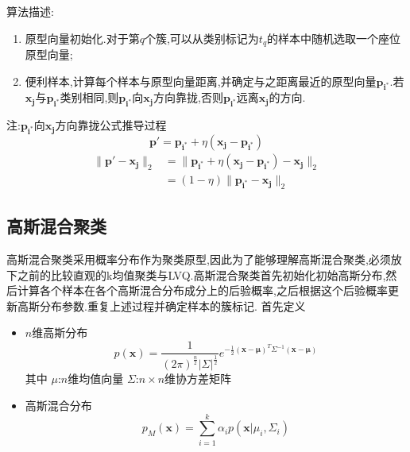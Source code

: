 算法描述:
\begin{enumerate}
\item 原型向量初始化.对于第$q$个簇,可以从类别标记为$t_q$的样本中随机选取一个座位原型向量;
\item 便利样本,计算每个样本与原型向量距离,并确定与之距离最近的原型向量$\mathbf{p_{i^\ast}}$.若$\mathbf{x_j}$与$\mathbf{p_{i^\ast}}$类别相同,则$\mathbf{p_{i^\ast}}$向$\mathbf{x_j}$方向靠拢,否则$\mathbf{p_{i^\ast}}$远离$\mathbf{x_j}$的方向.
\end{enumerate}
注:$\mathbf{p_{i^\ast}}$向$\mathbf{x_j}$方向靠拢公式推导过程
\begin{equation}
\mathbf{p'}=\mathbf{p_{i^\ast}}+\eta(\mathbf{x_j-p_{i^\ast}})
\end{equation}
\begin{equation}\begin{split}
\|\mathbf{p'-x_j}\|_2&=\|\mathbf{p_{i^\ast}}+\eta(\mathbf{x_j-p_{i^\ast}})-\mathbf{x_j}\|_2\\
&=(1-\eta)\|\mathbf{p_{i^\ast}-x_j}\|_2
\end{split}\end{equation}

\subsection{高斯混合聚类}

高斯混合聚类采用概率分布作为聚类原型,因此为了能够理解高斯混合聚类,必须放下之前的比较直观的k均值聚类与LVQ.高斯混合聚类首先初始化初始高斯分布,然后计算各个样本在各个高斯混合分布成分上的后验概率,之后根据这个后验概率更新高斯分布参数.重复上述过程并确定样本的簇标记.
首先定义
\begin{itemize}
\item $n$维高斯分布
    \begin{equation}
    p(\mathbf{x})=\frac{1}{(2\pi)^{\frac{n}{2}}|\Sigma|^{\frac{1}{2}}}e^{-\frac{1}{2}(\mathbf{x-\mu})^T\Sigma^{-1}(\mathbf{x-\mu})}
    \end{equation}
其中
$\mu$:$n$维均值向量
$\Sigma$:$n\times n$维协方差矩阵
\item 高斯混合分布
    \begin{equation}
    p_M(\mathbf{x})=\sum_{i=1}^k\alpha_ip(\mathbf{x}|\mu_i,\Sigma_i)
    \end{equation}
\end{itemize}

